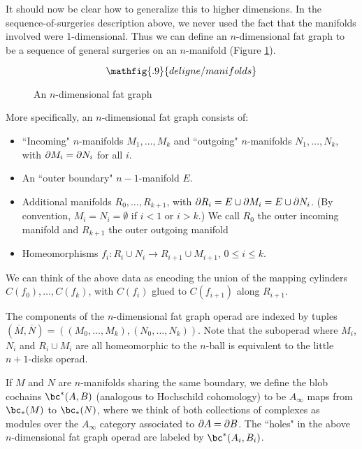 It should now be clear how to generalize this to higher dimensions.
In the sequence-of-surgeries description above, we never used the fact that the manifolds
involved were 1-dimensional.
Thus we can define an $n$-dimensional fat graph to be a sequence of general surgeries
on an $n$-manifold (Figure \ref{delfig2}).
\begin{figure}[!ht]
$$\mathfig{.9}{deligne/manifolds}$$
\caption{An  $n$-dimensional fat graph}\label{delfig2}
\end{figure}

More specifically, an $n$-dimensional fat graph consists of:
\begin{itemize}
\item ``Incoming" $n$-manifolds $M_1,\ldots,M_k$ and ``outgoing" $n$-manifolds $N_1,\ldots,N_k$,
with $\partial M_i = \partial N_i$ for all $i$.
\item An ``outer boundary" $n{-}1$-manifold $E$.
\item Additional manifolds $R_0,\ldots,R_{k+1}$, with $\partial R_i = E\cup \partial M_i = E\cup \partial N_i$.
(By convention, $M_i = N_i = \emptyset$ if $i <1$ or $i>k$.)
We call $R_0$ the outer incoming manifold and $R_{k+1}$ the outer outgoing manifold
\item Homeomorphisms $f_i : R_i\cup N_i\to R_{i+1}\cup M_{i+1}$, $0\le i \le k$.
\end{itemize}
We can think of the above data as encoding the union of the mapping cylinders $C(f_0),\ldots,C(f_k)$,
with $C(f_i)$ glued to $C(f_{i+1})$ along $R_{i+1}$.






The components of the $n$-dimensional fat graph operad are indexed by tuples
$(\overline{M}, \overline{N}) = ((M_0,\ldots,M_k), (N_0,\ldots,N_k))$.
Note that the suboperad where $M_i$, $N_i$ and $R_i\cup M_i$ are all homeomorphic to 
the $n$-ball is equivalent to the little $n{+}1$-disks operad.


If $M$ and $N$ are $n$-manifolds sharing the same boundary, we define
the blob cochains $\bc^*(A, B)$ (analogous to Hochschild cohomology) to be
$A_\infty$ maps from $\bc_*(M)$ to $\bc_*(N)$, where we think of both
collections of complexes as modules over the $A_\infty$ category associated to $\partial A = \partial B$.
The ``holes" in the above 
$n$-dimensional fat graph operad are labeled by $\bc^*(A_i, B_i)$.

